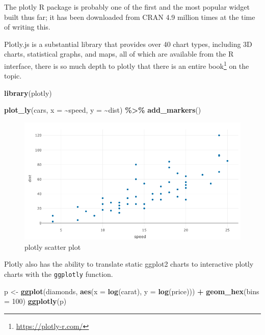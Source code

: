 \documentclass[
  10pt,
]{krantz}
\makeatletter
\newenvironment{Shaded}{\begin{snugshade}}{\end{snugshade}}
\newcommand{\DataTypeTok}[1]{\textcolor[rgb]{0.27,0.27,0.27}{#1}}
\newcommand{\DecValTok}[1]{\textcolor[rgb]{0.06,0.06,0.06}{#1}}
\newcommand{\KeywordTok}[1]{\textcolor[rgb]{0.27,0.27,0.27}{\textbf{#1}}}
\newcommand{\NormalTok}[1]{#1}
\newcommand{\OperatorTok}[1]{\textcolor[rgb]{0.43,0.43,0.43}{\textbf{#1}}}
\newcommand{\StringTok}[1]{\textcolor[rgb]{0.5,0.5,0.5}{#1}}
\renewcommand{\href}[2]{#2\footnote{\url{#1}}}
\newenvironment{kframe}{%
\medskip{}
\setlength{\fboxsep}{.8em}
 \def\at@end@of@kframe{}%
 \ifinner\ifhmode%
  \def\at@end@of@kframe{\end{minipage}}%
  \begin{minipage}{\columnwidth}%
 \fi\fi%
 \def\FrameCommand##1{\hskip\@totalleftmargin \hskip-\fboxsep
 \colorbox{shadecolor}{##1}\hskip-\fboxsep
     \hskip-\linewidth \hskip-\@totalleftmargin \hskip\columnwidth}%
 \MakeFramed {\advance\hsize-\width
   \@totalleftmargin\z@ \linewidth\hsize
   \@setminipage}}%
 {\par\unskip\endMakeFramed%
 \at@end@of@kframe}
\renewenvironment{Shaded}{\begin{kframe}}{\end{kframe}}
\makeatother
\begin{document}
The plotly \citep{R-plotly} R package is probably one of the first and the most popular widget built thus far; it has been downloaded from CRAN 4.9 million times at the time of writing this.

Plotly.js is a substantial library that provides over 40 chart types, including 3D charts, statistical graphs, and maps, all of which are available from the R interface, there is so much depth to plotly that there is an entire \href{https://plotly-r.com/}{book} on the topic.

\begin{Shaded}
\begin{Highlighting}[]
\KeywordTok{library}\NormalTok{(plotly)}

\KeywordTok{plot\_ly}\NormalTok{(cars, }\DataTypeTok{x =} \OperatorTok{\textasciitilde{}}\NormalTok{speed, }\DataTypeTok{y =} \OperatorTok{\textasciitilde{}}\NormalTok{dist) }\OperatorTok{\%>\%}\StringTok{ }
\StringTok{  }\KeywordTok{add\_markers}\NormalTok{()}
\end{Highlighting}
\end{Shaded}

\begin{figure}[H]

{\centering \includegraphics[width=1\linewidth]{images/03-plotly-scatter} 

}

\caption{plotly scatter plot}\label{fig:plotly-scatter-diagram}
\end{figure}

Plotly also has the ability to translate static ggplot2 \citep{R-ggplot2} charts to interactive plotly charts with the \texttt{ggplotly} function.

\begin{Shaded}
\begin{Highlighting}[]
\NormalTok{p <{-}}\StringTok{ }\KeywordTok{ggplot}\NormalTok{(diamonds, }\KeywordTok{aes}\NormalTok{(}\DataTypeTok{x =} \KeywordTok{log}\NormalTok{(carat), }\DataTypeTok{y =} \KeywordTok{log}\NormalTok{(price))) }\OperatorTok{+}\StringTok{ }
\StringTok{  }\KeywordTok{geom\_hex}\NormalTok{(}\DataTypeTok{bins =} \DecValTok{100}\NormalTok{)}
\KeywordTok{ggplotly}\NormalTok{(p)}
\end{Highlighting}
\end{Shaded}
\end{document}
